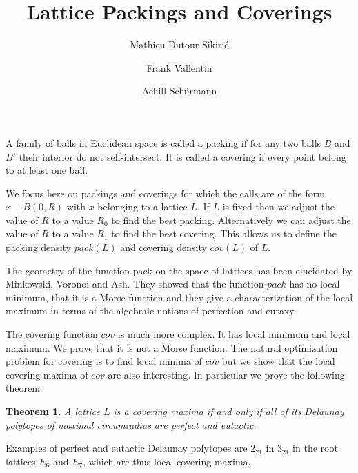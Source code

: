 \documentclass{amsart}
\title{Lattice Packings and Coverings}
\author{Mathieu Dutour Sikiri\'c}
\author{Frank Vallentin}
\author{Achill Sch\"urmann}
\begin{document}
\newcommand{\R}{\ensuremath{\mathbb{R}}}
\newcommand{\N}{\ensuremath{\mathbb{N}}}
\newcommand{\Q}{\ensuremath{\mathbb{Q}}}
\newcommand{\C}{\ensuremath{\mathbb{C}}}
\newcommand{\Z}{\ensuremath{\mathbb{Z}}}
\newcommand{\T}{\ensuremath{\mathbb{T}}}
\newtheorem{proposition}{Proposition}
\newtheorem{theorem}{Theorem}
\newtheorem{corollary}{Corollary}
\newtheorem{lemma}{Lemma}
\newtheorem{problem}{Problem}
\newtheorem{conjecture}{Conjecture}
\newtheorem{claim}{Claim}
\newtheorem{remark}{Remark}
\newtheorem{definition}{Definition}

\maketitle



A family of balls in Euclidean space is called a packing if for
any two balls $B$ and $B'$ their interior do not self-intersect. It is called
a covering if every point belong to at least one ball.

We focus here on packings and coverings for which the calls are of the form
$x + B(0,R)$ with $x$ belonging to a lattice $L$.
If $L$ is fixed then we adjust the
value of $R$ to a value $R_0$ to find the best packing. Alternatively we can
adjust the value of $R$ to a value $R_1$ to find the best covering. This allows
us to define the packing density $pack(L)$ and covering density $cov(L)$ of $L$.

The geometry of the function pack on the space of lattices has been
elucidated by Minkowski, Voronoi and Ash. They showed that the function
$pack$ has no local minimum, that it is a Morse function and they give
a characterization of the local maximum in terms of the algebraic notions
of perfection and eutaxy.

The covering function $cov$ is much more complex. It has local minimum and
local maximum. We prove that it is not a Morse function.
The natural optimization problem for covering is to find local minima of
$cov$ but we show that the local covering maxima of $cov$ are also interesting.
In particular we prove the following theorem:
\begin{theorem}
A lattice $L$ is a covering maxima if and only if all of its Delaunay polytopes of maximal circumradius are perfect and eutactic.
\end{theorem}
Examples of perfect and eutactic Delaunay polytopes
are $2_{21}$ in $3_{21}$ in the
root lattices $E_6$ and $E_7$, which are thus local covering maxima.
\end{document}
